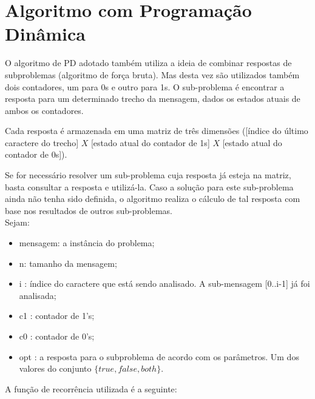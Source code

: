 \documentclass[a4paper,12pt,titlepage]{article}
\begin{document}
\section{Algoritmo com Programação Dinâmica}

O algoritmo de PD adotado também utiliza a ideia de combinar respostas de subproblemas (algoritmo de força bruta). Mas desta vez são utilizados também dois contadores, um para 0s e outro para 1s. O sub-problema é encontrar a resposta para um determinado trecho da mensagem, dados os estados atuais de ambos os contadores. 

Cada resposta é armazenada em uma matriz de três dimensões ([índice do último caractere do trecho] $X$ [estado atual do contador de 1s] $X$ [estado atual do contador de 0s]).

Se for necessário resolver um sub-problema cuja resposta já esteja na matriz, basta consultar a resposta e utilizá-la. Caso a solução para este sub-problema ainda não tenha sido definida, o algoritmo realiza o cálculo de tal resposta com base nos resultados de outros sub-problemas. \ \\

Sejam: 
\begin{itemize}[leftmargin=1.6cm]
    \item mensagem: a instância do problema;
    \item n: tamanho da mensagem;
    \item i : índice do caractere que está sendo analisado. A sub-mensagem [0..i-1] já foi analisada;
    \item c1 : contador de 1's;
    \item c0 : contador de 0's;
    \item opt : a resposta para o subproblema de acordo com os parâmetros. Um dos valores do conjunto $\{true, false, both\}$.
    \ \\
\end{itemize}

A função de recorrência utilizada é a seguinte: 
\ \\
\end{document}
